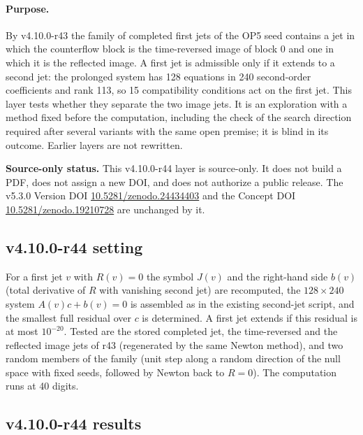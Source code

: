 \paragraph{Purpose.}
By v4.10.0-r43 the family of completed first jets of the OP5 seed contains a jet in which the counterflow block is the time-reversed image of
block 0 and one in which it is the reflected image.  A first jet is admissible only if it extends to a second jet: the prolonged system has 128
equations in 240 second-order coefficients and rank 113, so 15 compatibility conditions act on the first jet.  This layer tests whether they
separate the two image jets.  It is an exploration with a method fixed before the computation, including the check of the search direction
required after several variants with the same open premise; it is blind in its outcome.  Earlier layers are not rewritten.

\noindent\textbf{Source-only status.}
This v4.10.0-r44 layer is source-only.  It does not build a PDF, does not assign a new DOI,
and does not authorize a public release.  The v5.3.0 Version DOI
\href{https://doi.org/10.5281/zenodo.24434403}{10.5281/zenodo.24434403} and the Concept DOI
\href{https://doi.org/10.5281/zenodo.19210728}{10.5281/zenodo.19210728} are unchanged by it.

\subsection*{v4.10.0-r44 setting}
\label{subsec:v4100-r44-setting}

For a first jet \(v\) with \(R(v)=0\) the symbol \(J(v)\) and the right-hand side \(b(v)\) (total derivative of \(R\) with vanishing second jet) are
recomputed, the \(128\times240\) system \(A(v)c+b(v)=0\) is assembled as in the existing second-jet script, and the smallest full residual over
\(c\) is determined.  A first jet extends if this residual is at most \(10^{-20}\).  Tested are the stored completed jet, the time-reversed and the
reflected image jets of r43 (regenerated by the same Newton method), and two random members of the family (unit step along a random direction
of the null space with fixed seeds, followed by Newton back to \(R=0\)).  The computation runs at 40 digits.

\subsection*{v4.10.0-r44 results}
\label{subsec:v4100-r44-results}

